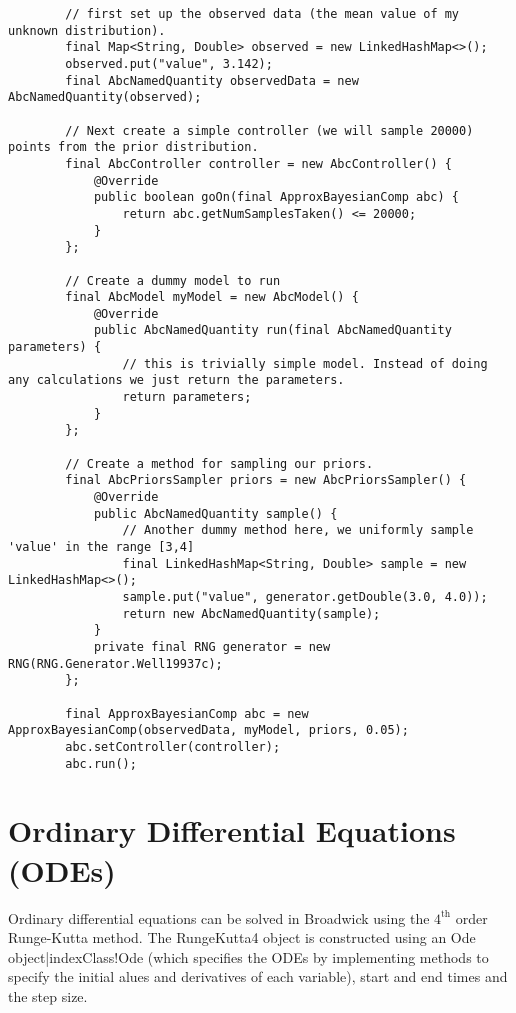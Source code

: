 \begin{lstlisting}
        // first set up the observed data (the mean value of my unknown distribution).
        final Map<String, Double> observed = new LinkedHashMap<>();
        observed.put("value", 3.142);
        final AbcNamedQuantity observedData = new AbcNamedQuantity(observed);

        // Next create a simple controller (we will sample 20000) points from the prior distribution.
        final AbcController controller = new AbcController() {
            @Override
            public boolean goOn(final ApproxBayesianComp abc) {
                return abc.getNumSamplesTaken() <= 20000;
            }
        };

        // Create a dummy model to run
        final AbcModel myModel = new AbcModel() {
            @Override
            public AbcNamedQuantity run(final AbcNamedQuantity parameters) {
                // this is trivially simple model. Instead of doing any calculations we just return the parameters.
                return parameters;
            }
        };

        // Create a method for sampling our priors.
        final AbcPriorsSampler priors = new AbcPriorsSampler() {
            @Override
            public AbcNamedQuantity sample() {
                // Another dummy method here, we uniformly sample 'value' in the range [3,4]
                final LinkedHashMap<String, Double> sample = new LinkedHashMap<>();
                sample.put("value", generator.getDouble(3.0, 4.0));
                return new AbcNamedQuantity(sample);
            }
            private final RNG generator = new RNG(RNG.Generator.Well19937c);
        };

        final ApproxBayesianComp abc = new ApproxBayesianComp(observedData, myModel, priors, 0.05);
        abc.setController(controller);
        abc.run();
\end{lstlisting}

\section{Ordinary Differential Equations (ODEs)}
Ordinary differential equations can be solved in Broadwick using the $4^\mathrm{th}$ order Runge-Kutta method. The RungeKutta4 object is constructed using an Ode object|index{Class!Ode} (which specifies the ODEs by implementing methods to specify the initial alues and derivatives of each variable), start and end times and the step size.

